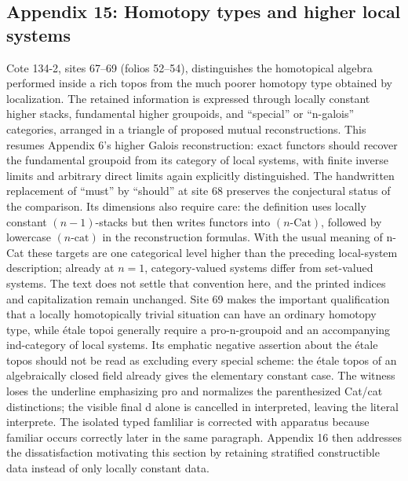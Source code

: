 \subsection*{Appendix 15: Homotopy types and higher local systems}
Cote 134-2, sites 67--69 (folios 52--54), distinguishes the homotopical algebra performed inside a rich topos from the much poorer homotopy type obtained by localization. The retained information is expressed through locally constant higher stacks, fundamental higher groupoids, and ``special'' or ``n-galois'' categories, arranged in a triangle of proposed mutual reconstructions. This resumes Appendix 6's higher Galois reconstruction: exact functors should recover the fundamental groupoid from its category of local systems, with finite inverse limits and arbitrary direct limits again explicitly distinguished. The handwritten replacement of ``must'' by ``should'' at site 68 preserves the conjectural status of the comparison. Its dimensions also require care: the definition uses locally constant $(n-1)$-stacks but then writes functors into $(n\text{-}\mathrm{Cat})$, followed by lowercase $(n\text{-}\mathrm{cat})$ in the reconstruction formulas. With the usual meaning of n-Cat these targets are one categorical level higher than the preceding local-system description; already at $n=1$, category-valued systems differ from set-valued systems. The text does not settle that convention here, and the printed indices and capitalization remain unchanged. Site 69 makes the important qualification that a locally homotopically trivial situation can have an ordinary homotopy type, while étale topoi generally require a pro-n-groupoid and an accompanying ind-category of local systems. Its emphatic negative assertion about the étale topos should not be read as excluding every special scheme: the étale topos of an algebraically closed field already gives the elementary constant case. The witness loses the underline emphasizing pro and normalizes the parenthesized Cat/cat distinctions; the visible final d alone is cancelled in interpreted, leaving the literal interprete. The isolated typed famliliar is corrected with apparatus because familiar occurs correctly later in the same paragraph. Appendix 16 then addresses the dissatisfaction motivating this section by retaining stratified constructible data instead of only locally constant data.

